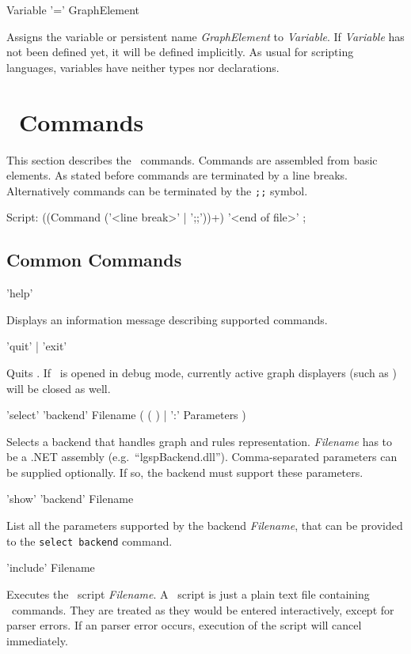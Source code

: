 \begin{rail}
  Variable '=' GraphElement   
\end{rail}
Assigns the variable or persistent name \emph{GraphElement} to \emph{Variable}. If \emph{Variable} has not been defined yet, it will be defined implicitly. As usual for scripting languages, variables have neither types nor declarations.

\section{\GrShell\ Commands}
This section describes the \GrShell\ commands. Commands are assembled from basic elements. As stated before commands are terminated by a line breaks. Alternatively commands can be terminated by the \texttt{;;} symbol.
\begin{rail}
  Script: ((Command ('<line break>' | ';;'))+) '<end of file>' ;
\end{rail}

\subsection{Common Commands}
\label{commcommands}
\begin{rail}
  'help'
\end{rail}
Displays an information message describing supported commands. 

\begin{rail}
  'quit' | 'exit'
\end{rail}
Quits \GrShell. If \GrShell\ is opened in debug mode, currently active graph displayers (such as \yComp) will be closed as well.

\begin{rail}
  'select' 'backend' Filename ( ( ) | ':' Parameters )
\end{rail}
Selects a backend that handles graph and rules representation. \emph{Filename} has to be a .NET assembly (e.g.\ ``lgspBackend.dll'').  Comma-separated parameters can be supplied optionally. If so, the backend must support these parameters.

\begin{rail}
  'show' 'backend' Filename
\end{rail}
List all the parameters supported by the backend \emph{Filename}, that can be provided to the \texttt{select backend} command.

\begin{rail}
  'include' Filename
\end{rail}
Executes the \GrShell\ script \emph{Filename}. A \GrShell\ script is just a plain text file containing \GrShell\ commands. They are treated as they would be entered interactively, except for parser errors. If an parser error occurs, execution of the script will cancel immediately.

